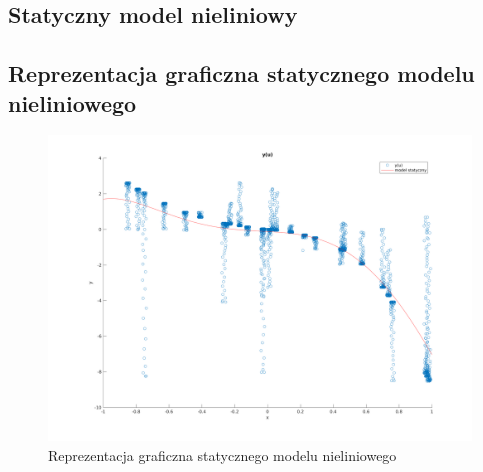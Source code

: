 \documentclass[a4paper, 11pt]{article}
\begin{document}
\subsection{Statyczny model nieliniowy}


\subsection{Reprezentacja graficzna statycznego modelu nieliniowego}
\begin{figure}[H]
\centering
\includegraphics[scale=0.50]{model_stat.png}
\caption{Reprezentacja graficzna statycznego modelu nieliniowego}
\label{}
\end{figure}
\end{document}
